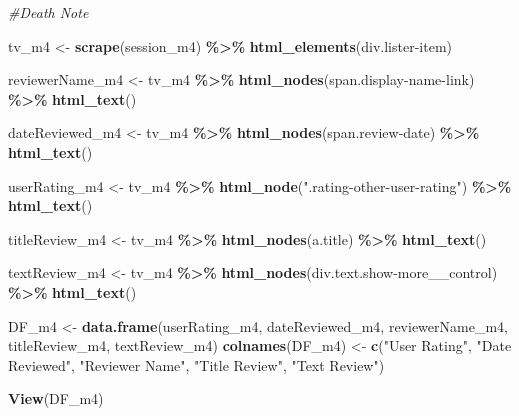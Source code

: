 \documentclass[
]{article}
\newenvironment{Shaded}{\begin{snugshade}}{\end{snugshade}}
\newcommand{\CommentTok}[1]{\textcolor[rgb]{0.56,0.35,0.01}{\textit{#1}}}
\newcommand{\FunctionTok}[1]{\textcolor[rgb]{0.13,0.29,0.53}{\textbf{#1}}}
\newcommand{\NormalTok}[1]{#1}
\newcommand{\OtherTok}[1]{\textcolor[rgb]{0.56,0.35,0.01}{#1}}
\newcommand{\SpecialCharTok}[1]{\textcolor[rgb]{0.81,0.36,0.00}{\textbf{#1}}}
\newcommand{\StringTok}[1]{\textcolor[rgb]{0.31,0.60,0.02}{#1}}
\begin{document}
\begin{Shaded}
\begin{Highlighting}[]
\CommentTok{\#Death Note}

\NormalTok{tv\_m4 }\OtherTok{\textless{}{-}} \FunctionTok{scrape}\NormalTok{(session\_m4) }\SpecialCharTok{\%\textgreater{}\%} 
  \FunctionTok{html\_elements}\NormalTok{(}\StringTok{\textquotesingle{}div.lister{-}item\textquotesingle{}}\NormalTok{)}

\NormalTok{reviewerName\_m4 }\OtherTok{\textless{}{-}}\NormalTok{ tv\_m4 }\SpecialCharTok{\%\textgreater{}\%}
  \FunctionTok{html\_nodes}\NormalTok{(}\StringTok{\textquotesingle{}span.display{-}name{-}link\textquotesingle{}}\NormalTok{) }\SpecialCharTok{\%\textgreater{}\%}
  \FunctionTok{html\_text}\NormalTok{()}

\NormalTok{dateReviewed\_m4 }\OtherTok{\textless{}{-}}\NormalTok{ tv\_m4 }\SpecialCharTok{\%\textgreater{}\%}
  \FunctionTok{html\_nodes}\NormalTok{(}\StringTok{\textquotesingle{}span.review{-}date\textquotesingle{}}\NormalTok{) }\SpecialCharTok{\%\textgreater{}\%}
  \FunctionTok{html\_text}\NormalTok{()}

\NormalTok{userRating\_m4 }\OtherTok{\textless{}{-}}\NormalTok{ tv\_m4 }\SpecialCharTok{\%\textgreater{}\%} 
  \FunctionTok{html\_node}\NormalTok{(}\StringTok{".rating{-}other{-}user{-}rating"}\NormalTok{) }\SpecialCharTok{\%\textgreater{}\%} 
  \FunctionTok{html\_text}\NormalTok{()}

\NormalTok{titleReview\_m4 }\OtherTok{\textless{}{-}}\NormalTok{ tv\_m4 }\SpecialCharTok{\%\textgreater{}\%}
  \FunctionTok{html\_nodes}\NormalTok{(}\StringTok{\textquotesingle{}a.title\textquotesingle{}}\NormalTok{) }\SpecialCharTok{\%\textgreater{}\%}
  \FunctionTok{html\_text}\NormalTok{()}

\NormalTok{textReview\_m4 }\OtherTok{\textless{}{-}}\NormalTok{ tv\_m4 }\SpecialCharTok{\%\textgreater{}\%}
  \FunctionTok{html\_nodes}\NormalTok{(}\StringTok{\textquotesingle{}div.text.show{-}more\_\_control\textquotesingle{}}\NormalTok{) }\SpecialCharTok{\%\textgreater{}\%}
  \FunctionTok{html\_text}\NormalTok{()}

\NormalTok{DF\_m4 }\OtherTok{\textless{}{-}} \FunctionTok{data.frame}\NormalTok{(userRating\_m4, dateReviewed\_m4, reviewerName\_m4, titleReview\_m4, textReview\_m4)}
\FunctionTok{colnames}\NormalTok{(DF\_m4) }\OtherTok{\textless{}{-}} \FunctionTok{c}\NormalTok{(}\StringTok{"User Rating"}\NormalTok{, }\StringTok{"Date Reviewed"}\NormalTok{, }\StringTok{"Reviewer Name"}\NormalTok{, }\StringTok{"Title Review"}\NormalTok{, }\StringTok{"Text Review"}\NormalTok{)}

\FunctionTok{View}\NormalTok{(DF\_m4)}


\end{Highlighting}
\end{Shaded}
\end{document}
